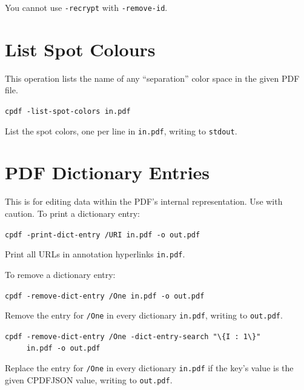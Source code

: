 \documentclass{book}
\begin{document}
\noindent You cannot use \texttt{-recrypt} with \texttt{-remove-id}.

\section{List Spot Colours}
This operation lists the name of any ``separation'' color space in the given PDF file.

  \begin{framed}
  \small\noindent\verb!cpdf -list-spot-colors in.pdf!

  \vspace{2.5mm}
  \noindent List the spot colors, one per line in \texttt{in.pdf}, writing to \texttt{stdout}.
  \end{framed}

\section{PDF Dictionary Entries}
\label{removedictentry}
This is for editing data within the PDF's internal representation. Use with caution.
To print a dictionary entry:

  \begin{framed}
  \small\noindent\verb!cpdf -print-dict-entry /URI in.pdf -o out.pdf!

  \vspace{2.5mm}
  \noindent Print all URLs in annotation hyperlinks \texttt{in.pdf}. 
  \end{framed}

\noindent To remove a dictionary entry:

  \begin{framed}
  \small\noindent\verb!cpdf -remove-dict-entry /One in.pdf -o out.pdf!

  \vspace{2.5mm}
  \noindent Remove the entry for \texttt{/One} in every dictionary \texttt{in.pdf}, writing to \texttt{out.pdf}. 

  \vspace{2.5mm}

  \small\noindent\verb!cpdf -remove-dict-entry /One -dict-entry-search "\{I : 1\}"!\\
  \small\noindent\verb!     in.pdf -o out.pdf!

  \vspace{2.5mm}
  \noindent Replace the entry for \texttt{/One} in every dictionary \texttt{in.pdf} if the key's value is the given CPDFJSON value, writing to \texttt{out.pdf}. 
  \end{framed}
\end{document}
